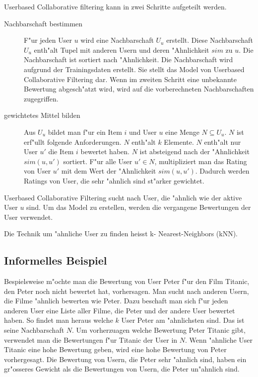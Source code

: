 \documentclass[a4paper, 12pt]{article}
\begin{document}
Userbased Collaborative filtering kann in zwei Schritte aufgeteilt werden. 

\begin{description}
\item[Nachbarschaft bestimmen] F"ur jeden User $u$ wird eine Nachbarschaft $U_u$ erstellt. Diese Nachbarschaft $U_u$ enth"alt Tupel mit anderen Usern und deren "Ahnlichkeit $sim$ zu $u$. Die Nachbarschaft ist sortiert nach "Ahnlichkeit. Die Nachbarschaft wird aufgrund der Trainingsdaten erstellt. Sie stellt das Model von Userbased Collaborative Filtering dar. Wenn im zweiten Schritt eine unbekannte Bewertung abgesch"atzt wird, wird auf die vorberechneten Nachbarschaften zugegriffen.
\item [gewichtetes Mittel bilden] Aus $U_u$ bildet man f"ur ein Item $i$ und User $u$ eine Menge $N \subseteq U_u$. $N$ ist erf"ullt folgende Anforderungen. $N$ enth"alt $k$ Elemente. $N$ enth"alt nur User $u'$ die Item $i$ bewertet haben. $N$ ist absteigend nach der "Ahnlichkeit $sim(u,u')$ sortiert. F"ur alle User $u' \in N$, multipliziert man das Rating von User $u'$ mit dem Wert der "Ahnlichkeit $sim(u,u')$. Dadurch werden Ratings von User, die sehr "ahnlich sind st"arker gewichtet. 
\end{description}

Userbased Collaborative Filtering sucht nach User, die "ahnlich wie der aktive User $u$ sind. Um das Model zu erstellen, werden die vergangene Bewertungen der User verwendet.

Die Technik um "ahnliche User zu finden heisst k- Nearest-Neighbors (kNN). 

\subsection{Informelles Beispiel}
\label{sec:example}

Bespielsweise m"ochte man die Bewertung von User Peter f"ur den Film Titanic, den Peter noch nicht bewertet hat, vorhersagen. Man sucht nach anderen Usern, die Filme "ahnlich bewerten wie Peter. Dazu beschaft man sich f"ur jeden anderen User eine Liste aller Filme, die Peter und der andere User bewertet haben. So findet man heraus welche $k$ User Peter am "ahnlichsten sind. Das ist seine Nachbarschaft $N$. Um vorherzuagen welche Bewertung Peter Titanic gibt, verwendet man die Bewertungen f"ur Titanic der User in $N$. Wenn "ahnliche User Titanic eine hohe Bewertung geben, wird eine hohe Bewertung von Peter vorhergesagt. Die Bewertung von Usern, die Peter sehr "ahnlich sind, haben ein gr"osseres Gewicht als die Bewertungen von Usern, die Peter un"ahnlich sind.
\end{document}
